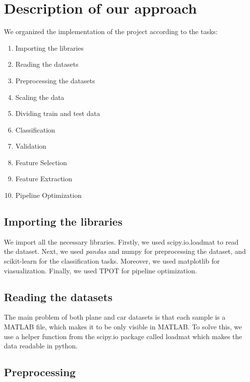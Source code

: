 \documentclass{article} %
\begin{document}
\section{Description of our approach}
  
We organized the implementation of the project according to the tasks:

\begin{multicols}{2}
\begin{enumerate} 
    \item Importing the libraries
    \item Reading the datasets
    \item Preprocessing the datasets
    \item Scaling the data
    \item Dividing train and test data
    \item Classification
    \item Validation
    \item Feature Selection
    \item Feature Extraction
    \item Pipeline Optimization
\end{enumerate}
\end{multicols}

\subsection{Importing the libraries}

We import all the necessary libraries. Firstly, we used scipy.io.loadmat to read the dataset. Next, we used \textit{pandas} and numpy for preprocessing the dataset, and scikit-learn for the classification tasks. Moreover, we used matplotlib for viasualization. Finally, we used TPOT for pipeline optimization.

\subsection{Reading the datasets}

The main problem of both plane and car datasets is that each sample is a MATLAB file, which makes it to be only visible in MATLAB. To solve this, we use a helper function from the scipy.io package called loadmat which makes the data readable in python.

\subsection{Preprocessing}
\end{document}
